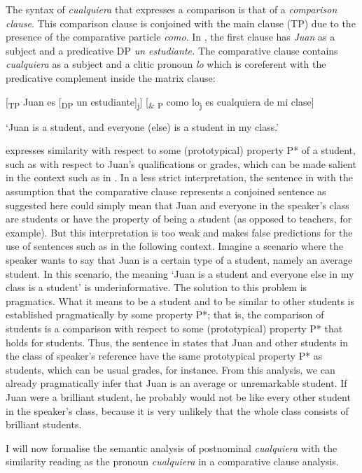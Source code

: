   The syntax of \textit{cualquiera} that expresses a comparison is that of a \textit{comparison clause}. This comparison clause is conjoined with the main clause (TP) due to the presence of the comparative particle \textit{como}. In , the first clause has \textit{Juan} as a subject and a predicative DP \textit{un estudiante.} The comparative clause contains \textit{cualquiera} as a subject and a clitic pronoun \textit{lo} which is coreferent with the predicative complement inside the matrix clause:

\label{bkm:Ref72354100}  [\textsubscript{TP} Juan es [\textsubscript{DP} un estudiante]\textsubscript{j}] [\textsubscript{\& P} como lo\textsubscript{j} es cualquiera de mi clase]

  ‘Juan is a student, and everyone (else) is a student in my class.’

 expresses similarity with respect to some (prototypical) property P* of a student, such as with respect to Juan’s qualifications or grades, which can be made salient in the context such as in . In a less strict interpretation, the sentence in  with the assumption that the comparative clause represents a conjoined sentence as suggested here could simply mean that Juan and everyone in the speaker’s class are students or have the property of being a student (as opposed to teachers, for example). But this interpretation is too weak and makes false predictions for the use of sentences such as  in the following context. Imagine a scenario where the speaker wants to say that Juan is a certain type of a student, namely an average student. In this scenario, the meaning ‘Juan is a student and everyone else in my class is a student’ is underinformative. The solution to this problem is pragmatics. What it means to be a student and to be similar to other students is established pragmatically by some property P*; that is, the comparison of students is a comparison with respect to some (prototypical) property P* that holds for students. Thus, the sentence in  states that Juan and other students in the class of speaker’s reference have the same prototypical property P* as students, which can be usual grades, for instance. From this analysis, we can already pragmatically infer that Juan is an average or unremarkable student. If Juan were a brilliant student, he probably would not be like every other student in the speaker’s class, because it is very unlikely that the whole class consists of brilliant students. 

  I will now formalise the semantic analysis of postnominal \textit{cualquiera} with the similarity reading as the pronoun \textit{cualquiera} in a comparative clause analysis.

